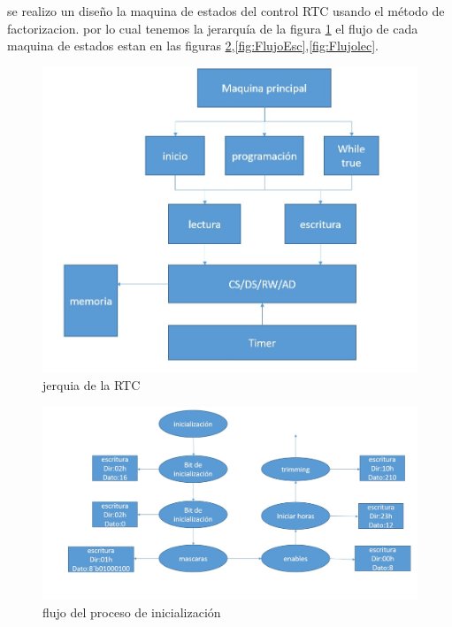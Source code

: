 \documentclass[12pt,a4paper]{report}
\begin{document}
se realizo un diseño la maquina de estados del control RTC usando el método de factorizacion. por lo cual tenemos la jerarquía de la figura \ref{fig:JerarquiaRTC} el flujo de cada maquina de estados estan en las figuras \ref{fig:FlujoInt},\ref{fig:FlujoEsc},\ref{fig:Flujolec}.\\
\begin{figure}[hbtp]
	\centering
	\includegraphics[width=16cm]{Img/JerarquiaRTC.jpg}
	\caption{jerquia de la RTC}
	\label{fig:JerarquiaRTC}
\end{figure}
\begin{figure}[hbtp]
	\centering
	\includegraphics[width=16cm]{Img/FlujoInit.jpg}
	\caption{flujo del proceso de inicialización}
	\label{fig:FlujoInt}
\end{figure}
\end{document}
